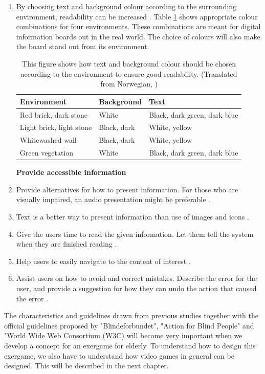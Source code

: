 \begin{enumerate}[{g}.1]
\item By choosing text and background colour according to the surrounding environment, readability can be increased \cite{blindeforbundetTekst}. Table \ref{tab:contrastenvironment} shows appropriate colour combinations for four environments. These combinations are meant for digital information boards out in the real world. The choice of colours will also make the board stand out from its environment.  

\begin{table} [ht!]
\centering
    \begin{tabular}{|p{}|p{}|p{}|}
       \hline
       \textbf{Environment} & \textbf{Background} & \textbf{Text} \\ \hline
		Red brick, dark stone & White & Black, dark green, dark blue \\ \hline
		Light brick, light stone & Black, dark & White, yellow \\ \hline
		Whitewashed wall & Black, dark & White, yellow \\ \hline
		Green vegetation & White & Black, dark green, dark blue \\ \hline
    \end{tabular}
    \caption[Colours and contrasts - environment]{This figure shows how text and background colour should be chosen according to the environment to ensure good readability. (Translated from Norwegian, \cite{blindeforbundetTekst})}
    \label{tab:contrastenvironment}
\end{table} 
\newpage

\textbf{Provide accessible information}
\item Provide alternatives for how to present information. For those who are visually impaired, an audio presentation might be preferable \cite{blindeforbundetTekst} \cite{w3cTekst}. 
\item Text is a better way to present information than use of images and icons \cite{w3cTekst}.
\item Give the users time to read the given information. Let them tell the system when they are finished reading \cite{w3cTekst}.  
\item Help users to easily navigate to the content of interest \cite{w3cTekst}.
\item Assist users on how to avoid and correct mistakes. Describe the error for the user, and provide a suggestion for how they can undo the action that caused the error \cite{w3cTekst}.      
\end{enumerate} 

The characteristics and guidelines drawn from previous studies together with the official guidelines proposed by "Blindeforbundet", "Action for Blind People" and "World Wide Web Consortium (W3C) will become very important  when we develop a concept for an exergame for elderly. To understand how to design this exergame, we also have to understand how video games in general can be designed. This will be described in the next chapter.




